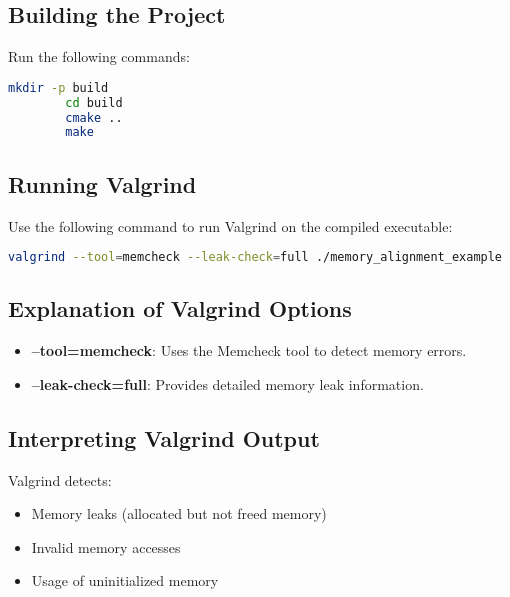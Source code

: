 \documentclass{article}
\begin{document}
	\subsection{Building the Project}
	Run the following commands:
	\begin{lstlisting}[language=bash, caption=Building the Project]
		mkdir -p build
		cd build
		cmake ..
		make
	\end{lstlisting}
	
	\subsection{Running Valgrind}
	Use the following command to run Valgrind on the compiled executable:
	\begin{lstlisting}[language=bash, caption=Running Valgrind]
		valgrind --tool=memcheck --leak-check=full ./memory_alignment_example
	\end{lstlisting}
	
	\subsection{Explanation of Valgrind Options}
	\begin{itemize}
		\item \textbf{--tool=memcheck}: Uses the Memcheck tool to detect memory errors.
		\item \textbf{--leak-check=full}: Provides detailed memory leak information.
	\end{itemize}
	
	\subsection{Interpreting Valgrind Output}
	Valgrind detects:
	\begin{itemize}
		\item Memory leaks (allocated but not freed memory)
		\item Invalid memory accesses
		\item Usage of uninitialized memory
	\end{itemize}
	
\end{document}
